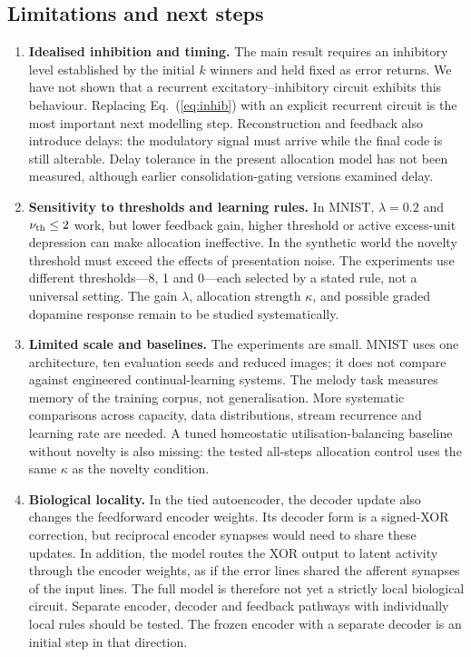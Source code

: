 \documentclass[11pt,a4paper]{article}
\begin{document}
\subsection{Limitations and next steps}
\begin{enumerate}[leftmargin=*]
\item \textbf{Idealised inhibition and timing.} The main result requires an inhibitory level established by the initial $k$ winners and held fixed as error returns. We have not shown that a recurrent excitatory--inhibitory circuit exhibits this behaviour. Replacing Eq.~(\ref{eq:inhib}) with an explicit recurrent circuit is the most important next modelling step. Reconstruction and feedback also introduce delays: the modulatory signal must arrive while the final code is still alterable. Delay tolerance in the present allocation model has not been measured, although earlier consolidation-gating versions examined delay.
\item \textbf{Sensitivity to thresholds and learning rules.} In MNIST, $\lambda=0.2$ and $\nu_{\rm th}\le2$ work, but lower feedback gain, higher threshold or active excess-unit depression can make allocation ineffective. In the synthetic world the novelty threshold must exceed the effects of presentation noise. The experiments use different thresholds---8, 1 and 0---each selected by a stated rule, not a universal setting. The gain $\lambda$, allocation strength $\kappa$, and possible graded dopamine response remain to be studied systematically.
\item \textbf{Limited scale and baselines.} The experiments are small. MNIST uses one architecture, ten evaluation seeds and reduced images; it does not compare against engineered continual-learning systems. The melody task measures memory of the training corpus, not generalisation. More systematic comparisons across capacity, data distributions, stream recurrence and learning rate are needed. A tuned homeostatic utilisation-balancing baseline without novelty is also missing: the tested all-steps allocation control uses the same $\kappa$ as the novelty condition.
\item \textbf{Biological locality.} In the tied autoencoder, the decoder update also changes the feedforward encoder weights. Its decoder form is a signed-XOR correction, but reciprocal encoder synapses would need to share these updates. In addition, the model routes the XOR output to latent activity through the encoder weights, as if the error lines shared the afferent synapses of the input lines. The full model is therefore not yet a strictly local biological circuit. Separate encoder, decoder and feedback pathways with individually local rules should be tested. The frozen encoder with a separate decoder is an initial step in that direction.

\end{enumerate}
\end{document}
